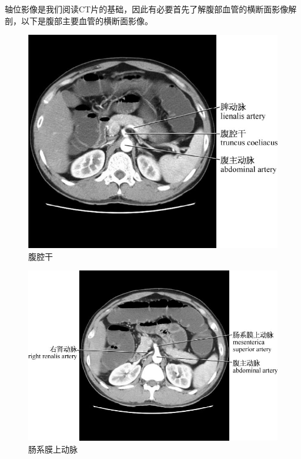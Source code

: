 轴位影像是我们阅读CT片的基础，因此有必要首先了解腹部血管的横断面影像解剖，以下是腹部主要血管的横断面影像。

\begin{figure}[!htbp]
 \centering
 \includegraphics{./images/Image00191.jpg}
 \captionsetup{justification=centering}
 \caption{腹腔干}
  \end{figure} 
 \FloatBarrier

\begin{figure}[!htbp]
 \centering
 \includegraphics{./images/Image00192.jpg}
 \captionsetup{justification=centering}
 \caption{肠系膜上动脉}
  \end{figure} 
 \FloatBarrier

